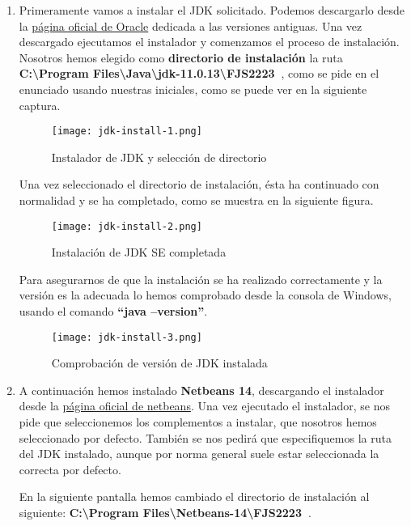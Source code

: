 \begin{enumerate}[label=(\alph*)]
    \item Primeramente vamos a instalar el JDK solicitado. Podemos descargarlo desde la \href{https://www.oracle.com/java/technologies/javase/jdk13-archive-downloads.html}{página oficial de Oracle} dedicada a las versiones antiguas. Una vez descargado ejecutamos el instalador y comenzamos el proceso de instalación. Nosotros hemos elegido como \textbf{directorio de instalación} la ruta \textbf{C:\textbackslash Program Files\textbackslash Java\textbackslash jdk-11.0.13\textbackslash FJS2223\ }, como se pide en el enunciado usando nuestras iniciales, como se puede ver en la siguiente captura.

    \begin{figure}[ht]
        \centering
        \texttt{[image: jdk-install-1.png]}
        \caption{Instalador de JDK y selección de directorio}
    \end{figure}

    Una vez seleccionado el directorio de instalación, ésta ha continuado con normalidad y se ha completado, como se muestra en la siguiente figura.

    \begin{figure}[ht]
        \centering
        \texttt{[image: jdk-install-2.png]}
        \caption{Instalación de JDK SE completada}
    \end{figure}

    Para asegurarnos de que la instalación se ha realizado correctamente y la versión es la adecuada lo hemos comprobado desde la consola de Windows, usando el comando \textbf{``java --version''}.

    \begin{figure}[ht]
        \centering
        \texttt{[image: jdk-install-3.png]}
        \caption{Comprobación de versión de JDK instalada}
    \end{figure}

    \item A continuación hemos instalado \textbf{Netbeans 14}, descargando el instalador desde la \href{https://netbeans.apache.org/download/nb14/}{página oficial de netbeans}. Una vez ejecutado el instalador, se nos pide que seleccionemos los complementos a instalar, que nosotros hemos seleccionado por defecto. También se nos pedirá que especifiquemos la ruta del JDK instalado, aunque por norma general suele estar seleccionada la correcta por defecto.

     En la siguiente pantalla hemos cambiado el directorio de instalación al siguiente: \textbf{C:\textbackslash Program Files\textbackslash Netbeans-14\textbackslash FJS2223\ }.


\end{enumerate}
